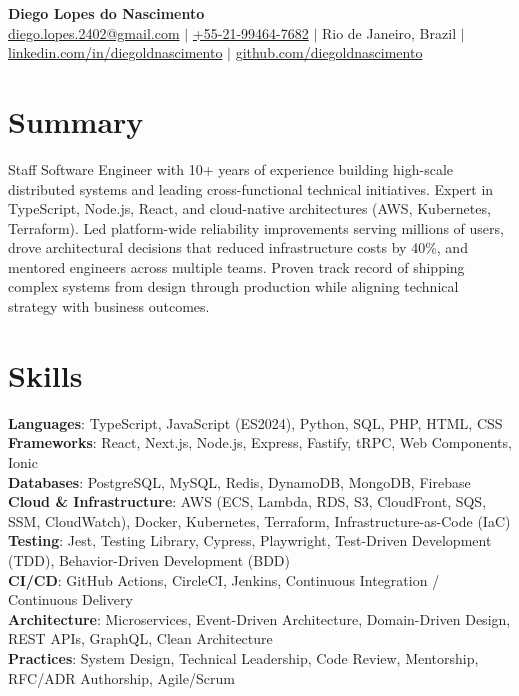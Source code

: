 \documentclass[letterpaper,11pt]{article}
\begin{document}
\begin{center}
  \textbf{\Large Diego Lopes do Nascimento} \\
  \vspace{2pt}
  \small
  \href{mailto:diego.lopes.2402@gmail.com}{diego.lopes.2402@gmail.com} $|$
  \href{tel:+5521994647682}{+55-21-99464-7682} $|$
  Rio de Janeiro, Brazil $|$
  \href{https://linkedin.com/in/diegoldnascimento}{linkedin.com/in/diegoldnascimento} $|$
  \href{https://github.com/diegoldnascimento}{github.com/diegoldnascimento}
\end{center}

\section{Summary}
Staff Software Engineer with 10+ years of experience building high-scale distributed systems and leading cross-functional technical initiatives. Expert in TypeScript, Node.js, React, and cloud-native architectures (AWS, Kubernetes, Terraform). Led platform-wide reliability improvements serving millions of users, drove architectural decisions that reduced infrastructure costs by 40\%, and mentored engineers across multiple teams. Proven track record of shipping complex systems from design through production while aligning technical strategy with business outcomes.

\section{Skills}
\begin{itemize}[leftmargin=0.15in, label={}]
  \small{\item{
    \textbf{Languages}{: TypeScript, JavaScript (ES2024), Python, SQL, PHP, HTML, CSS} \\
    \textbf{Frameworks}{: React, Next.js, Node.js, Express, Fastify, tRPC, Web Components, Ionic} \\
    \textbf{Databases}{: PostgreSQL, MySQL, Redis, DynamoDB, MongoDB, Firebase} \\
    \textbf{Cloud \& Infrastructure}{: AWS (ECS, Lambda, RDS, S3, CloudFront, SQS, SSM, CloudWatch), Docker, Kubernetes, Terraform, Infrastructure-as-Code (IaC)} \\
    \textbf{Testing}{: Jest, Testing Library, Cypress, Playwright, Test-Driven Development (TDD), Behavior-Driven Development (BDD)} \\
    \textbf{CI/CD}{: GitHub Actions, CircleCI, Jenkins, Continuous Integration / Continuous Delivery} \\
    \textbf{Architecture}{: Microservices, Event-Driven Architecture, Domain-Driven Design, REST APIs, GraphQL, Clean Architecture} \\
    \textbf{Practices}{: System Design, Technical Leadership, Code Review, Mentorship, RFC/ADR Authorship, Agile/Scrum}
  }}
\end{itemize}
\end{document}
